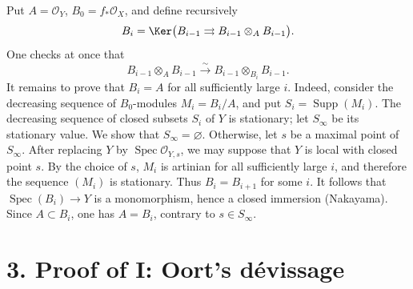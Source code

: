 Put $A=\mathcal O_Y$, $B_0=f_*\mathcal O_X$, and define recursively
\[
  B_i=\Ker\bigl(
    B_{i-1}\rightrightarrows B_{i-1}\otimes_A B_{i-1}
  \bigr).
\]
One checks at once that
\[
  B_{i-1}\otimes_A B_{i-1}
  \xrightarrow{\sim}
  B_{i-1}\otimes_{B_i}B_{i-1}.
\]
It remains to prove that $B_i=A$ for all sufficiently large $i$. Indeed,
consider the decreasing sequence of $B_0$-modules $M_i=B_i/A$, and put
$S_i=\operatorname{Supp}(M_i)$. The decreasing sequence of closed subsets $S_i$ of $Y$
is stationary; let $S_\infty$ be its stationary value. We show that
$S_\infty=\varnothing$. Otherwise, let $s$ be a maximal point of
$S_\infty$. After replacing $Y$ by $\operatorname{Spec}\mathcal O_{Y,s}$, we may suppose
that $Y$ is local with closed point $s$. By the choice of $s$, $M_i$ is
artinian for all sufficiently large $i$, and therefore the sequence $(M_i)$
is stationary. Thus $B_i=B_{i+1}$ for some $i$. It follows that
$\operatorname{Spec}(B_i)\to Y$ is a monomorphism, hence a closed immersion (Nakayama).
Since $A\subset B_i$, one has $A=B_i$, contrary to $s\in S_\infty$.

\section*{3. Proof of I: Oort's d\'evissage}

